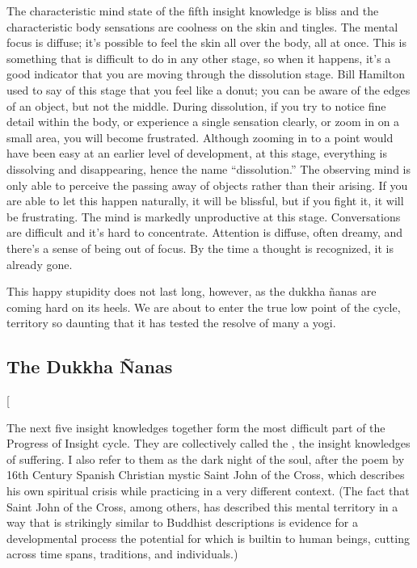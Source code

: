 \documentclass[a5paper,10pt,english]{book}
\begin{document}
\sphinxAtStartPar
The characteristic mind state of the fifth insight knowledge is bliss
and the characteristic body sensations are coolness on the skin and
tingles. The mental focus is diffuse; it’s possible to feel the skin all
over the body, all at once. This is something that is difficult to do in
any other stage, so when it happens, it’s a good indicator that you are
moving through the dissolution stage. Bill Hamilton used to say of this
stage that you feel like a donut; you can be aware of the edges of an
object, but not the middle. During dissolution, if you try to notice
fine detail within the body, or experience a single sensation clearly,
or zoom in on a small area, you will become frustrated. Although zooming
in to a point would have been easy at an earlier level of development,
at this stage, everything is dissolving and disappearing, hence the name
“dissolution.” The observing mind is only able to perceive the passing
away of objects rather than their arising. If you are able to let this
happen naturally, it will be blissful, but if you fight it, it will be
frustrating. The mind is markedly unproductive at this stage.
Conversations are difficult and it’s hard to concentrate. Attention is
diffuse, often dreamy, and there’s a sense of being out of focus. By the
time a thought is recognized, it is already gone.

\sphinxAtStartPar
This happy stupidity does not last long, however, as the dukkha ñanas
are coming hard on its heels. We are about to enter the true low point
of the cycle, territory so daunting that it has tested the resolve of
many a yogi.


\subsection{The Dukkha Ñanas}
\label{\detokenize{main-2:the-dukkha-nanas}}
\sphinxAtStartPar
{[}\sphinxstyleemphasis{Ñana (pronounced “nyana”) is a word from the Pali language of ancient
India, translated here as (insight knowledge).}{]}

\sphinxAtStartPar
The next five insight knowledges together form the most difficult part
of the Progress of Insight cycle. They are collectively called the
, the insight knowledges of suffering. I also refer to
them as the dark night of the soul, after the poem by 16th Century
Spanish Christian mystic Saint John of the Cross, which describes his
own spiritual crisis while practicing in a very different context. (The
fact that Saint John of the Cross, among others, has described this
mental territory in a way that is strikingly similar to Buddhist
descriptions is evidence for a developmental process the potential for
which is built\sphinxhyphen{}in to human beings, cutting across time spans,
traditions, and individuals.)
\end{document}

